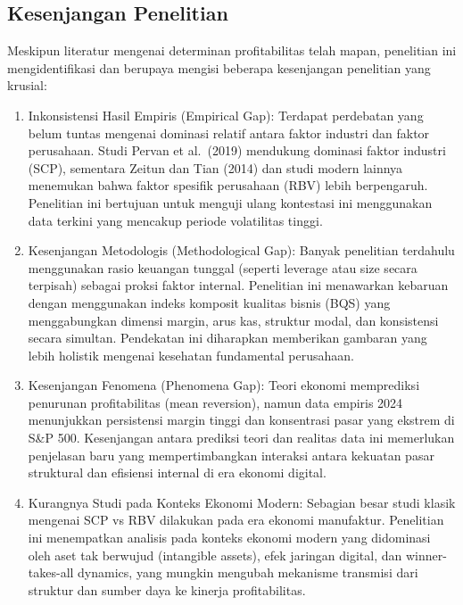 \documentclass[12pt,a4paper]{report}
\providecommand{\tightlist}{%
  \setlength{\itemsep}{0pt}\setlength{\parskip}{0pt}%
}
\begin{document}
\hypertarget{kesenjangan-penelitian}{%
\subsection{Kesenjangan Penelitian}\label{kesenjangan-penelitian}}

Meskipun literatur mengenai determinan profitabilitas telah mapan,
penelitian ini mengidentifikasi dan berupaya mengisi beberapa
kesenjangan penelitian yang krusial:

\begin{enumerate}
\def\labelenumi{\arabic{enumi}.}
\tightlist
\item
  Inkonsistensi Hasil Empiris (Empirical Gap): Terdapat perdebatan yang
  belum tuntas mengenai dominasi relatif antara faktor industri dan
  faktor perusahaan. Studi Pervan et al.~(2019) mendukung dominasi
  faktor industri (SCP), sementara Zeitun dan Tian (2014) dan studi
  modern lainnya menemukan bahwa faktor spesifik perusahaan (RBV) lebih
  berpengaruh. Penelitian ini bertujuan untuk menguji ulang kontestasi
  ini menggunakan data terkini yang mencakup periode volatilitas tinggi.
\item
  Kesenjangan Metodologis (Methodological Gap): Banyak penelitian
  terdahulu menggunakan rasio keuangan tunggal (seperti leverage atau
  size secara terpisah) sebagai proksi faktor internal. Penelitian ini
  menawarkan kebaruan dengan menggunakan indeks komposit kualitas bisnis
  (BQS) yang menggabungkan dimensi margin, arus kas, struktur modal, dan
  konsistensi secara simultan. Pendekatan ini diharapkan memberikan
  gambaran yang lebih holistik mengenai kesehatan fundamental
  perusahaan.
\item
  Kesenjangan Fenomena (Phenomena Gap): Teori ekonomi memprediksi
  penurunan profitabilitas (mean reversion), namun data empiris 2024
  menunjukkan persistensi margin tinggi dan konsentrasi pasar yang
  ekstrem di S\&P 500. Kesenjangan antara prediksi teori dan realitas
  data ini memerlukan penjelasan baru yang mempertimbangkan interaksi
  antara kekuatan pasar struktural dan efisiensi internal di era ekonomi
  digital.
\item
  Kurangnya Studi pada Konteks Ekonomi Modern: Sebagian besar studi
  klasik mengenai SCP vs RBV dilakukan pada era ekonomi manufaktur.
  Penelitian ini menempatkan analisis pada konteks ekonomi modern yang
  didominasi oleh aset tak berwujud (intangible assets), efek jaringan
  digital, dan winner-takes-all dynamics, yang mungkin mengubah
  mekanisme transmisi dari struktur dan sumber daya ke kinerja
  profitabilitas.
\end{enumerate}
\end{document}
